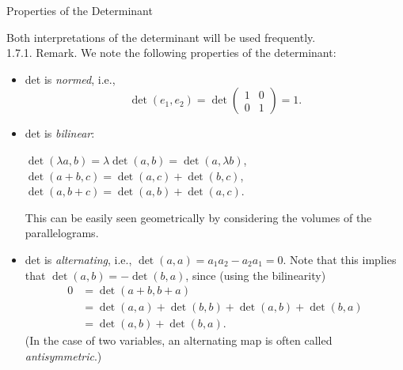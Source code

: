 \documentclass[smaller,hyperref={CJKbookmarks=true}]{beamer}
\begin{document}
\begin{frame}{Properties of the Determinant}
\begin{spacing}{1.3}
Both interpretations of the determinant will be used frequently.\\
\alert{1.7.1. Remark.} We note the following properties of the determinant:
\begin{itemize}
  \item[1.] det is \emph{normed}, i.e.,
        \[\det(e_1,e_2)=\det\begin{pmatrix}
                              1 & 0 \\
                              0 & 1
                            \end{pmatrix}=1.\]
  \item[2.] det is \emph{bilinear}:
        \begin{center}
          $\det(\lambda a,b)=\lambda\det(a,b)=\det(a,\lambda b)$,\\
          $\det(a+b,c)=\det(a,c)+\det(b,c)$,\\
          $\det(a,b+c)=\det(a,b)+\det(a,c)$.
        \end{center}
        This can be easily seen geometrically by considering the volumes of
        the parallelograms.
        \newpage
  \item[3.] det is \emph{alternating}, i.e., $\det(a,a)=a_1a_2-a_2a_1=0$. Note that this implies that $\det(a,b)=-\det(b,a)$, since (using the bilinearity)
      \begin{equation*}
        \begin{split}
           0 &=\det(a+b,b+a)  \\
             &=\det(a,a)+\det(b,b)+\det(a,b)+\det(b,a)  \\
             &=\det(a,b)+\det(b,a).
        \end{split}
      \end{equation*}
      (In the case of two variables, an alternating map is often called
      \emph{antisymmetric}.)
\end{itemize}
\end{spacing}
\end{frame}
\end{document}
